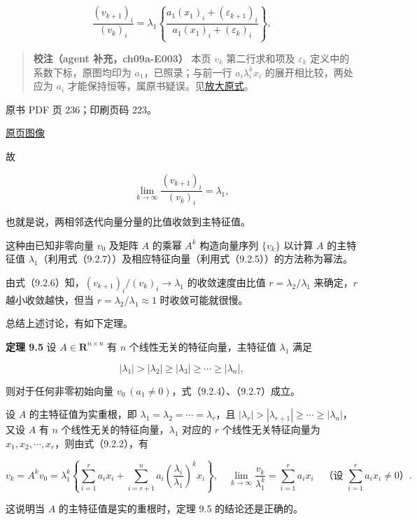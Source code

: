 \[
\frac{(v_{k+1})_i}{(v_k)_i}=\lambda_1\left\{\frac{a_1(x_1)_i+(\varepsilon_{k+1})_i}{a_1(x_1)_i+(\varepsilon_k)_i}\right\},
\tag{9.2.6}
\]

\begin{quote}
\textbf{校注（agent 补充，ch09a-E003）} 本页 \(v_k\) 第二行求和项及 \(\varepsilon_k\) 定义中的系数下标，原图均印为 \(a_1\)，已照录；与前一行 \(a_i\lambda_i^kx_i\) 的展开相比较，两处应为 \(a_i\) 才能保持恒等，属原书疑误。见\href{verified/assets/ch09a/review-p235-power-expansion.png}{放大原式}。
\end{quote}

\clearpage

原书 PDF 页 236；印刷页码 223。

\href{source-images/pdf-236.jpeg}{原页图像}

故

\[
\lim_{k\to\infty}\frac{(v_{k+1})_i}{(v_k)_i}=\lambda_1,
\tag{9.2.7}
\]

也就是说，两相邻迭代向量分量的比值收敛到主特征值。

这种由已知非零向量 \(v_0\) 及矩阵 \(A\) 的乘幂 \(A^k\) 构造向量序列 \(\{v_k\}\) 以计算 \(A\) 的主特征值 \(\lambda_1\)（利用式（9.2.7））及相应特征向量（利用式（9.2.5））的方法称为幂法。

由式（9.2.6）知，\((v_{k+1})_i/(v_k)_i\to\lambda_1\) 的收敛速度由比值 \(r=\lambda_2/\lambda_1\) 来确定，\(r\) 越小收敛越快，但当 \(r=\lambda_2/\lambda_1\approx1\) 时收敛可能就很慢。

总结上述讨论，有如下定理。

\textbf{定理 9.5} 设 \(A\in\mathbf R^{n\times n}\) 有 \(n\) 个线性无关的特征向量，主特征值 \(\lambda_1\) 满足

\[
|\lambda_1|>|\lambda_2|\geq|\lambda_3|\geq\cdots\geq|\lambda_n|,
\]

则对于任何非零初始向量 \(v_0\ (a_1\ne0)\)，式（9.2.4）、（9.2.7）成立。

设 \(A\) 的主特征值为实重根，即 \(\lambda_1=\lambda_2=\cdots=\lambda_r\)，且 \(|\lambda_r|>|\lambda_{r+1}|\geq\cdots\geq|\lambda_n|\)，又设 \(A\) 有 \(n\) 个线性无关的特征向量，\(\lambda_1\) 对应的 \(r\) 个线性无关特征向量为 \(x_1,x_2,\cdots,x_r\)，则由式（9.2.2），有

\[
v_k=A^kv_0=\lambda_1^k\left\{\sum_{i=1}^ra_ix_i+\sum_{i=r+1}^na_i\left(\frac{\lambda_i}{\lambda_1}\right)^kx_i\right\},\quad
\lim_{k\to\infty}\frac{v_k}{\lambda_1^k}=\sum_{i=1}^ra_ix_i\quad\text{（设 }\sum_{i=1}^ra_ix_i\ne0\text{）}.
\]

这说明当 \(A\) 的主特征值是实的重根时，定理 9.5 的结论还是正确的。

